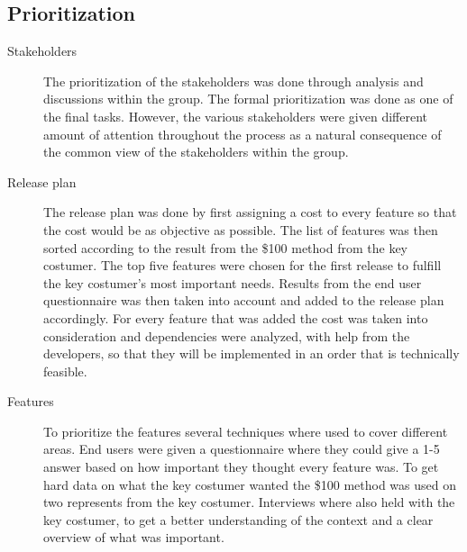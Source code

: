 \documentclass[10pt,a4paper]{article}
\begin{document}
\subsection{Prioritization}
\begin{description}
\item[Stakeholders] 
The prioritization of the stakeholders was done through analysis and discussions within the group. The formal prioritization was done as one of the final tasks. However, the various stakeholders were given different amount of attention throughout the process as a natural consequence of the common view of the stakeholders within the group. 

\item[Release plan]
The release plan was done by first assigning a cost to every feature so that the cost would be as objective as possible. The list of features was then sorted according to the result from the \$100 method from the key costumer. The top five features were chosen for the first release to fulfill the key costumer’s most important needs. Results from the end user questionnaire was then taken into account and added to the release plan accordingly. For every feature that was added the cost was taken into consideration and dependencies were analyzed, with help from the developers, so that they will be implemented in an order that is technically feasible. 

\item[Features] To prioritize the features several techniques where used to cover different areas. End users were given a questionnaire where they could give a 1-5 answer based on how important they thought every feature was. To get hard data on what the key costumer wanted the \$100 method was used on two represents from the key costumer. Interviews where also held with the key costumer, to get a better understanding of the context and a clear overview of what was important.
\end{description}

\end{document}
